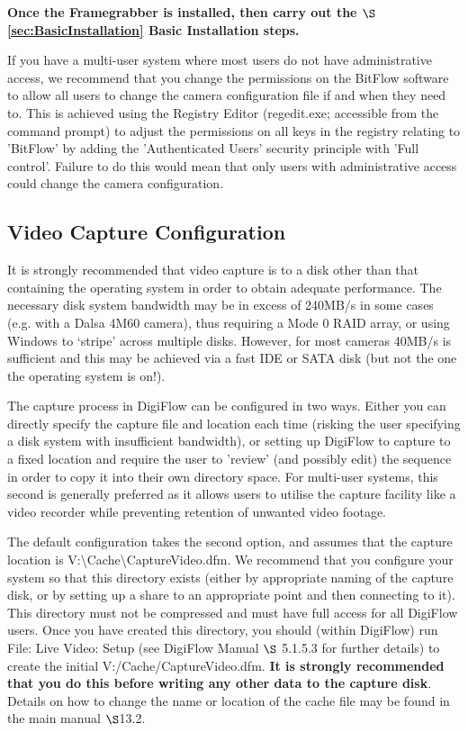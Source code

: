 \documentclass{article}
\newcommand{\Analyse}[1]{\textcolor{mygreen}{#1}}
\newcommand{\Files}[1]{\textcolor{myblue}{#1}}
\begin{document}
\textbf{Once the Framegrabber is installed, then carry out the $\S$ \ref{sec:BasicInstallation} Basic Installation steps.}

If you have a multi-user system where most users do not have administrative access, we recommend that you change the permissions on the BitFlow software to allow all users to change the camera configuration file if and when they need to. This is achieved using the Registry Editor (regedit.exe; accessible from the command prompt) to adjust the permissions
on all keys in the registry relating to 'BitFlow' by adding the 'Authenticated Users' security principle with 'Full control'. Failure to do this would mean that only users with administrative access could change the camera configuration.

\subsection{Video Capture Configuration}
It is strongly recommended that video capture is to a disk other than that containing the operating system in order to obtain adequate performance. The necessary disk system bandwidth may be in excess of 240MB/s in some cases (e.g. with a Dalsa 4M60 camera), thus requiring a Mode 0 RAID array, or using Windows to ‘stripe’ across multiple disks. However, for most cameras 40MB/s is sufficient and this may be achieved via a fast IDE or SATA disk (but not the one the operating system is on!).

The capture process in DigiFlow can be configured in two ways. Either you can directly specify the capture file and location each time (risking the user specifying a disk system with insufficient bandwidth), or setting up DigiFlow to capture to a fixed location and require the user to 'review' (and possibly edit) the sequence in order to copy it into their own directory space. For multi-user systems, this second is generally preferred as it allows users to utilise the capture facility like a video recorder while preventing retention of unwanted video footage.

The default configuration takes the second option, and assumes that the capture location is \Files{V:\textbackslash Cache\textbackslash CaptureVideo.dfm}. We recommend that you configure your system so that this directory exists (either by appropriate naming of the capture disk, or by setting up a share to an appropriate point and then connecting to it). This directory must not be compressed and must have full access for all DigiFlow users. Once you have created this directory, you should (within DigiFlow) run \Analyse{File: Live Video: Setup} (see DigiFlow Manual $\S$ 5.1.5.3 for further details) to create the initial \Files{V:/Cache/CaptureVideo.dfm}. \textbf{It is strongly recommended that you do this before writing any other data to the capture disk}. Details on how to change the name or location of the cache file may be found in the main manual $\S$13.2.
\end{document}
